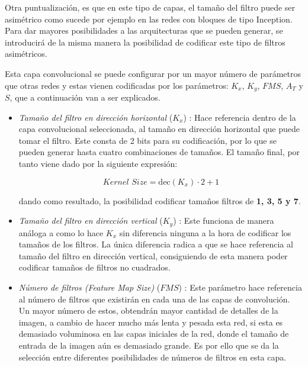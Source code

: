 \begin{itemize}
    Otra puntualización, es que en este tipo de capas, el tamaño del filtro puede ser asimétrico como sucede por ejemplo en las redes con bloques de tipo Inception. Para dar mayores posibilidades a las arquitecturas que se pueden generar, se introducirá de la misma manera la posibilidad de codificar este tipo de filtros asimétricos.
    
    Esta capa convolucional se puede configurar por un mayor número de parámetros que otras redes y estas vienen codificadas por los parámetros: $K_{x}$, $K_{y}$, $FMS$, $A_T$ y $S$, que a continuación van a ser explicados.
    
    \begin{itemize}
        \item \textit{Tamaño del filtro en dirección horizontal} ($K_{x}$) : Hace referencia dentro de la capa convolucional seleccionada, al tamaño en dirección horizontal que puede tomar el filtro. Este consta de 2 bits para su codificación, por lo que se pueden generar hasta cuatro combinaciones de tamaños. El tamaño final, por tanto viene dado por la siguiente expresión:
        
        \begin{equation}
            \textit{Kernel Size} = \text{dec}(K_x) \cdot 2 + 1
        \end{equation}
        
        dando como resultado, la posibilidad codificar tamaños filtros de \textbf{1, 3, 5 y 7}.
        
        \item \textit{Tamaño del filtro en dirección vertical} ($K_{y}$) : Este funciona de manera análoga a como lo hace $K_x$ sin diferencia ninguna a la hora de codificar los tamaños de los filtros. La única diferencia radica a que se hace referencia al tamaño del filtro en dirección vertical, consiguiendo de esta manera poder codificar tamaños de filtros no cuadrados.
        
        \item \textit{Número de filtros (Feature Map Size)} ($FMS$) : Este parámetro hace referencia al número de filtros que existirán en cada una de las capas de convolución. Un mayor número de estos, obtendrán mayor cantidad de detalles de la imagen, a cambio de hacer mucho más lenta y pesada esta red, si esta es demasiado voluminosa en las capas iniciales de la red, donde el tamaño de entrada de la imagen aún es demasiado grande. Es por ello que se da la selección entre diferentes posibilidades de números de filtros en esta capa.
        

\end{itemize}
\end{itemize}
